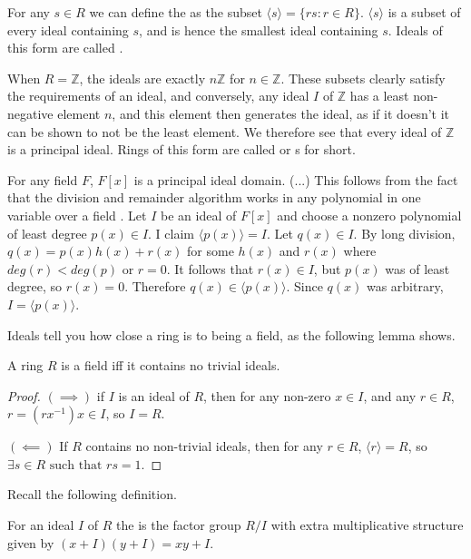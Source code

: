 \begin{example}
For any $s\in R$ we can define the  as the subset $\langle s\rangle =\{rs:r\in R\}$. $\langle s\rangle$ is a subset of every ideal containing $s$, and is hence the smallest ideal containing $s$. Ideals of this form are called .
\end{example}
\begin{example}
When $R=\mathbb{Z}$, the ideals are exactly $n\mathbb{Z}$ for $n\in \mathbb{Z}$. These subsets clearly satisfy the requirements of an ideal, and conversely, any ideal $I$ of $\mathbb{Z}$ has a least non-negative element $n$, and this element then generates the ideal, as if it doesn't it can be shown to not be the least element. We therefore see that every ideal of $\mathbb{Z}$ is a principal ideal. Rings of this form are called  or s for short.
\end{example}
\begin{example}\label{F[x]-PID}
For any field $F$, $F[x]$ is a principal ideal domain. (...) This follows from the fact that the division and remainder algorithm works in any polynomial in one variable over a field \cite{HonoursAlgebra}. Let $I$ be an ideal of $F[x]$ and choose a nonzero polynomial of least degree $p(x)\in I$. I claim $\langle p(x)\rangle =I$. Let $q(x)\in I$. By long division, $q(x)=p(x)h(x)+r(x)$ for some $h(x)$ and $r(x)$ where $deg(r)<deg(p)$ or $r=0$. It follows that $r(x)\in I$, but $p(x)$ was of least degree, so $r(x)=0$. Therefore $q(x)\in \langle p(x)\rangle$. Since $q(x)$ was arbitrary, $I=\langle p(x)\rangle$.
\end{example}


Ideals tell you how close a ring is to being a field, as the following lemma shows.
\begin{lemma}\label{field-iff-no-ideals}
A ring $R$ is a field iff it contains no trivial ideals.
\end{lemma}
\begin{proof}
$(\implies)$ if $I$ is an ideal of $R$, then for any non-zero $x\in I$, and any $r\in R$, $r=(rx^{-1})x\in I$, so $I=R$.

$(\impliedby)$ If $R$ contains no non-trivial ideals, then for any $r\in R$, $\langle r\rangle =R$, so $\exists s\in R \text{ such that } rs=1$.
\end{proof}
Recall the following definition.
\begin{definition}
For an ideal $I$ of $R$ the  is the factor group $R/I$ with extra multiplicative structure given by $(x+I)(y+I)=xy+I$.
\end{definition}

